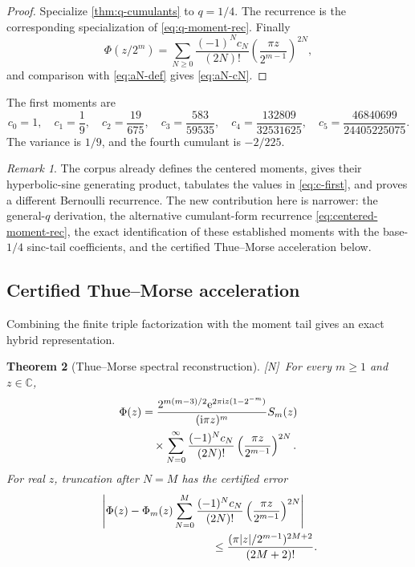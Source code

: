 \documentclass[11pt,oneside]{article}
\newtheorem{theorem}{Theorem}[section]
\theoremstyle{definition}
\theoremstyle{remark}
\newtheorem{remark}[theorem]{Remark}
\newcommand{\C}{\mathbb C}
\newcommand{\e}{\mathrm e}
\newcommand{\ii}{\mathrm i}
\newcommand{\statusN}{\textsf{[N]}}
\begin{document}
\begin{proof}
Specialize \cref{thm:q-cumulants} to $q=1/4$.  The recurrence is the corresponding
specialization of \eqref{eq:q-moment-rec}.  Finally
\[
 \Phi(z/2^m)=\sum_{N\ge0}\frac{(-1)^Nc_N}{(2N)!}
 \left(\frac{\pi z}{2^{m-1}}\right)^{2N},
\]
and comparison with \eqref{eq:aN-def} gives \eqref{eq:aN-cN}.
\end{proof}

The first moments are
\begin{equation}
 c_0=1,
 \quad c_1=\frac19,
 \quad c_2=\frac{19}{675},
 \quad c_3=\frac{583}{59535},
 \quad c_4=\frac{132809}{32531625},
 \quad c_5=\frac{46840699}{24405225075}.                   \label{eq:c-first}
\end{equation}
The variance is $1/9$, and the fourth cumulant is $-2/225$.

\begin{remark}
The corpus already defines the centered moments, gives their hyperbolic-sine generating
product, tabulates the values in \eqref{eq:c-first}, and proves a different Bernoulli
recurrence.  The new contribution here is narrower: the general-$q$ derivation, the
alternative cumulant-form recurrence \eqref{eq:centered-moment-rec}, the exact identification
of these established moments with the base-$1/4$ sinc-tail coefficients, and the certified
Thue--Morse acceleration below.
\end{remark}

\subsection{Certified Thue--Morse acceleration}
Combining the finite triple factorization with the moment tail gives an exact hybrid
representation.

\begin{theorem}[Thue--Morse spectral reconstruction]\label{thm:TM-reconstruction}
\statusN\ For every $m\ge1$ and $z\in\C$,
\begin{align}
 \Phi(z)
 &=\frac{2^{m(m-3)/2}\e^{2\pi\ii z(1-2^{-m})}}{(\ii\pi z)^m}
 S_m(z)                                                     \notag\\
 &\quad\times
 \sum_{N=0}^{\infty}\frac{(-1)^Nc_N}{(2N)!}
 \left(\frac{\pi z}{2^{m-1}}\right)^{2N}.                 \label{eq:TM-reconstruction}
\end{align}
For real $z$, truncation after $N=M$ has the certified error
\begin{align}
 &\left|\Phi(z)-\Phi_m(z)
 \sum_{N=0}^{M}\frac{(-1)^Nc_N}{(2N)!}
 \left(\frac{\pi z}{2^{m-1}}\right)^{2N}\right|           \notag\\
 &\hspace{35mm}\le
 \frac{(\pi|z|/2^{m-1})^{2M+2}}{(2M+2)!}.                 \label{eq:TM-error}
\end{align}
\end{theorem}
\end{document}
